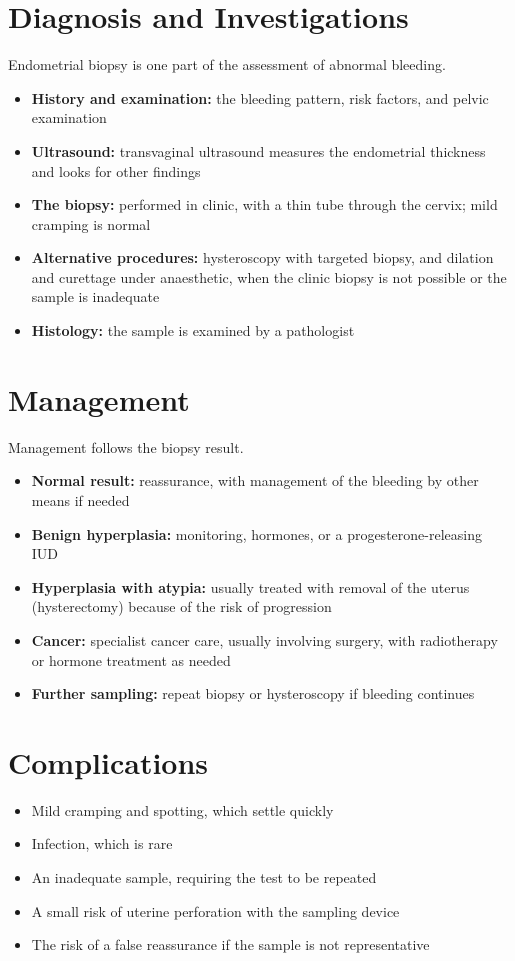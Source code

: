 \section*{Diagnosis and Investigations}
Endometrial biopsy is one part of the assessment of abnormal bleeding.
\begin{itemize}
    \item \textbf{History and examination:} the bleeding pattern, risk factors, and pelvic examination
    \item \textbf{Ultrasound:} transvaginal ultrasound measures the endometrial thickness and looks for other findings
    \item \textbf{The biopsy:} performed in clinic, with a thin tube through the cervix; mild cramping is normal
    \item \textbf{Alternative procedures:} hysteroscopy with targeted biopsy, and dilation and curettage under anaesthetic, when the clinic biopsy is not possible or the sample is inadequate
    \item \textbf{Histology:} the sample is examined by a pathologist
\end{itemize}

\section*{Management}
Management follows the biopsy result.
\begin{itemize}
    \item \textbf{Normal result:} reassurance, with management of the bleeding by other means if needed
    \item \textbf{Benign hyperplasia:} monitoring, hormones, or a progesterone-releasing IUD
    \item \textbf{Hyperplasia with atypia:} usually treated with removal of the uterus (hysterectomy) because of the risk of progression
    \item \textbf{Cancer:} specialist cancer care, usually involving surgery, with radiotherapy or hormone treatment as needed
    \item \textbf{Further sampling:} repeat biopsy or hysteroscopy if bleeding continues
\end{itemize}

\section*{Complications}
\begin{itemize}
    \item Mild cramping and spotting, which settle quickly
    \item Infection, which is rare
    \item An inadequate sample, requiring the test to be repeated
    \item A small risk of uterine perforation with the sampling device
    \item The risk of a false reassurance if the sample is not representative
\end{itemize}

